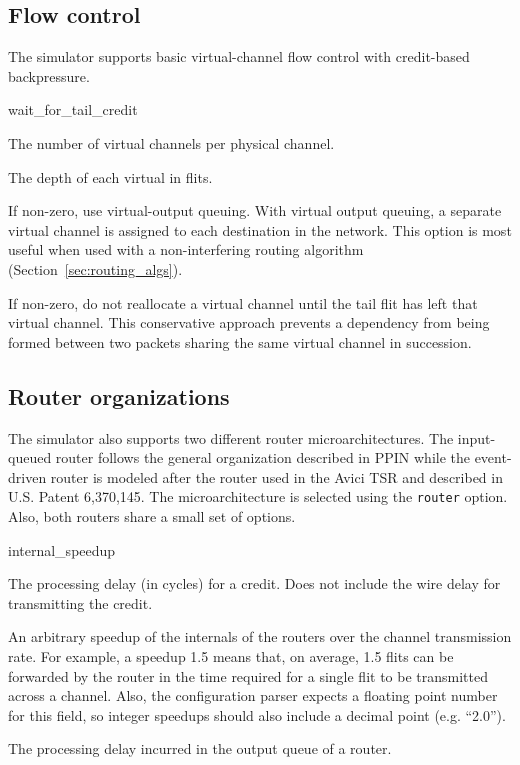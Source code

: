 \documentclass[11pt]{article}
\begin{document}
\subsection{Flow control}

The simulator supports basic virtual-channel flow control with
credit-based backpressure.  

\begin{opt_list}{wait\_for\_tail\_credit}

\item[num\_vcs] The number of virtual channels per physical channel.

\item[vc\_buf\_size] The depth of each virtual in flits.

\item[voq] If non-zero, use virtual-output queuing.  With virtual
output queuing, a separate virtual channel is assigned to each
destination in the network.  This option is most useful when used with
a non-interfering routing algorithm (Section~\ref{sec:routing_algs}).
  
\item[wait\_for\_tail\_credit] If non-zero, do not reallocate a virtual
channel until the tail flit has left that virtual channel.  This
conservative approach prevents a dependency from being formed between
two packets sharing the same virtual channel in succession.
\end{opt_list}

\subsection{Router organizations}

The simulator also supports two different router microarchitectures.
The input-queued router follows the general organization described in
PPIN while the event-driven router is modeled after the router used in
the Avici TSR and described in U.S. Patent 6,370,145.  The
microarchitecture is selected using the \texttt{router} option.  Also,
both routers share a small set of options.

\begin{opt_list}{internal\_speedup}
\item[credit\_delay] The processing delay (in cycles) for a credit.
Does not include the wire delay for transmitting the credit.

\item[internal\_speedup] An arbitrary speedup of the internals of the
routers over the channel transmission rate.  For example, a speedup
1.5 means that, on average, 1.5 flits can be forwarded by the router
in the time required for a single flit to be transmitted across a
channel.  Also, the configuration parser expects a floating point
number for this field, so integer speedups should also include a
decimal point (e.g. ``2.0'').

\item[output\_delay] The processing delay incurred in the output queue
of a router.
\end{opt_list}
\end{document}
